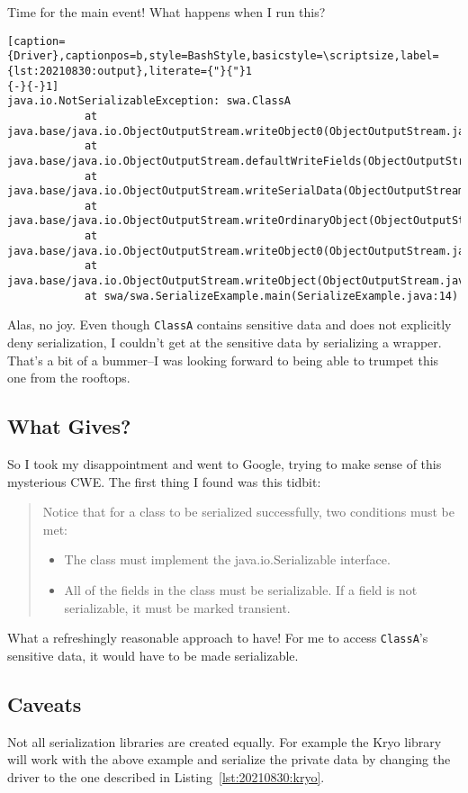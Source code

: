 Time for the main event! What happens when I run this?
\begin{lstlisting}[caption={Driver},captionpos=b,style=BashStyle,basicstyle=\scriptsize,label={lst:20210830:output},literate={"}{"}1
{-}{-}1]
java.io.NotSerializableException: swa.ClassA
            at java.base/java.io.ObjectOutputStream.writeObject0(ObjectOutputStream.java:1192)
            at java.base/java.io.ObjectOutputStream.defaultWriteFields(ObjectOutputStream.java:1577)
            at java.base/java.io.ObjectOutputStream.writeSerialData(ObjectOutputStream.java:1534)
            at java.base/java.io.ObjectOutputStream.writeOrdinaryObject(ObjectOutputStream.java:1443)
            at java.base/java.io.ObjectOutputStream.writeObject0(ObjectOutputStream.java:1186)
            at java.base/java.io.ObjectOutputStream.writeObject(ObjectOutputStream.java:352)
            at swa/swa.SerializeExample.main(SerializeExample.java:14)
\end{lstlisting}

Alas, no joy. Even though \texttt{ClassA} contains sensitive data and does not explicitly deny serialization, I couldn't get at the sensitive data by serializing a wrapper. That's a bit of a bummer--I was looking forward to being able to trumpet this one from the rooftops.

\subsection{What Gives?}
So I took my disappointment and went to Google, trying to make sense of this mysterious CWE. The first thing I found was this tidbit:
\begin{quote}
	Notice that for a class to be serialized successfully, two conditions must be met:
	\begin{itemize}
		\item The class must implement the java.io.Serializable interface.
		\item All of the fields in the class must be serializable. If a field is not serializable, it must be marked transient.
	\end{itemize}\autocite{20210830:javaserialization}
\end{quote}

What a refreshingly reasonable approach to have! For me to access \texttt{ClassA}'s sensitive data, it would have to be made serializable.

\subsection{Caveats}
Not all serialization libraries are created equally. For example the Kryo library will work with the above example and serialize the private data by changing the driver to the one described in Listing~\ref{lst:20210830:kryo}.\autocite{20210830:kryo}

